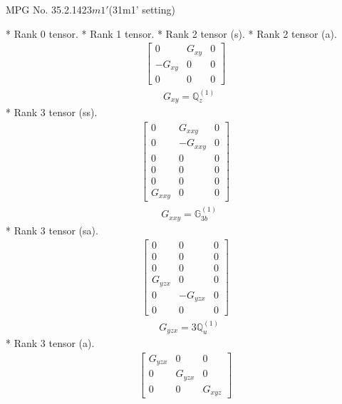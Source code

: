 \documentclass[fleqn,8pt,landscape]{jsarticle}
\begin{document}
\setcounter{MaxMatrixCols}{32}

\renewcommand{\tablename}{Table~}
\renewcommand{\figurename}{Figure~}
\begin{center}
\LARGE
MPG No. 35.2.142\quad$3m1'$\quad(31m1' setting)
\end{center}
* Rank 0 tensor.
* Rank 1 tensor.
* Rank 2 tensor (s).
* Rank 2 tensor (a).
\begin{align*}
\begin{bmatrix} 0 & G_{xy} & 0 \\ - G_{xy} & 0 & 0 \\ 0 & 0 & 0 \end{bmatrix}
\end{align*}
\begin{align*}
& G_{xy} = \mathbb{Q}_{z}^{(1)}
\end{align*}
* Rank 3 tensor (ss).
\begin{align*}
\begin{bmatrix} 0 & G_{xxy} & 0 \\ 0 & - G_{xxy} & 0 \\ 0 & 0 & 0 \\ 0 & 0 & 0 \\ 0 & 0 & 0 \\ G_{xxy} & 0 & 0 \end{bmatrix}
\end{align*}
\begin{align*}
& G_{xxy} = \mathbb{G}_{3b}^{(1)}
\end{align*}
* Rank 3 tensor (sa).
\begin{align*}
\begin{bmatrix} 0 & 0 & 0 \\ 0 & 0 & 0 \\ 0 & 0 & 0 \\ G_{yzx} & 0 & 0 \\ 0 & - G_{yzx} & 0 \\ 0 & 0 & 0 \end{bmatrix}
\end{align*}
\begin{align*}
& G_{yzx} = 3 \mathbb{Q}_{u}^{(1)}
\end{align*}
* Rank 3 tensor (a).
\begin{align*}
\begin{bmatrix} G_{yzx} & 0 & 0 \\ 0 & G_{yzx} & 0 \\ 0 & 0 & G_{xyz} \end{bmatrix}
\end{align*}
\end{document}
